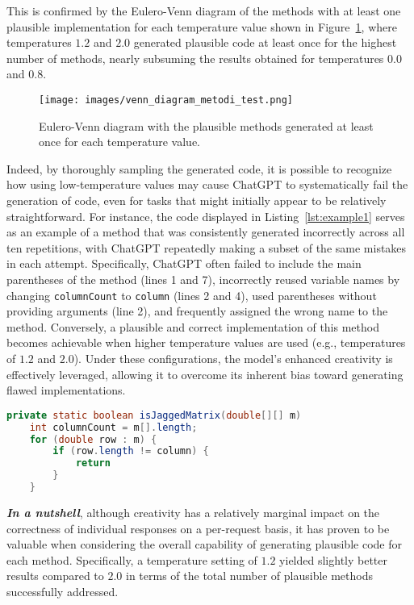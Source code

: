 This is confirmed by the Eulero-Venn diagram of the methods with at least one plausible implementation for each temperature value shown in Figure~\ref{fig:EuleroVenn}, where temperatures $1.2$ and $2.0$ generated plausible code at least once for the highest number of methods, nearly subsuming the results obtained for temperatures $0.0$ and $0.8$.  

\begin{figure}[ht]
        \centering
        \texttt{[image: images/venn\_diagram\_metodi\_test.png]}
        \caption{Eulero-Venn diagram with the plausible methods generated at least once for each temperature value.}
        \label{fig:EuleroVenn}
\end{figure}

Indeed, by thoroughly sampling the generated code, it is possible to recognize how using low-temperature values may cause ChatGPT to systematically fail the generation of code, even for tasks that might initially appear to be relatively straightforward. For instance, the code displayed in Listing~\ref{lst:example1} serves as an example of a method that was consistently generated incorrectly across all ten repetitions, with ChatGPT repeatedly making a subset of the same mistakes in each attempt. Specifically, ChatGPT often failed to include the main parentheses of the method (lines 1 and 7), incorrectly reused variable names by changing \texttt{columnCount} to \texttt{column} (lines 2 and 4), used parentheses without providing arguments (line 2), and frequently assigned the wrong name to the method.
Conversely, a plausible and correct implementation of this method becomes achievable when higher temperature values are used (e.g., temperatures of $1.2$ and $2.0$). Under these configurations, the model's enhanced creativity is effectively leveraged, allowing it to overcome its inherent bias toward generating flawed implementations.


\begin{lstlisting}[language=Java,
xleftmargin=.12in,
label=lst:example1,caption=Invalid code obtained with Temperature 0.0.]
private static boolean isJaggedMatrix(double[][] m) 
    int columnCount = m[].length;
    for (double row : m) {
        if (row.length != column) {
            return
        }
    }
\end{lstlisting}

\textbf{\textit{In a nutshell}}, although creativity has a relatively marginal impact on the correctness of individual responses on a per-request basis, it has proven to be valuable when considering the overall capability of generating plausible code for each method. Specifically, a temperature setting of $1.2$ yielded slightly better results compared to $2.0$ in terms of the total number of plausible methods successfully addressed.

